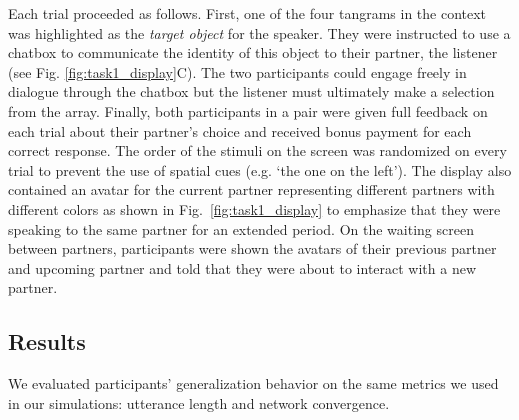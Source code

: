 Each trial proceeded as follows.
First, one of the four tangrams in the context was highlighted as the \emph{target object} for the speaker.
They were instructed to use a chatbox to communicate the identity of this object to their partner, the listener (see Fig. \ref{fig:task1_display}C).
The two participants could engage freely in dialogue through the chatbox but the listener must ultimately make a selection from the array. 
Finally, both participants in a pair were given full feedback on each trial about their partner's choice and received bonus payment for each correct response. 
The order of the stimuli on the screen was randomized on every trial to prevent the use of spatial cues (e.g. `the one on the left').
The display also contained an avatar for the current partner  representing different partners with different colors as shown in Fig.~\ref{fig:task1_display} to emphasize that they were speaking to the same partner for an extended period.
On the waiting screen between partners, participants were shown the avatars of their previous partner and upcoming partner and told that they were about to interact with a new partner.

\subsection{Results}

We evaluated participants' generalization behavior on the same metrics we used in our simulations: utterance length and network convergence.

